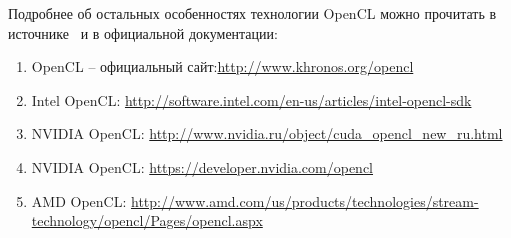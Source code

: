 \inputminted{c++}{listings/opencl_kernel_example.cpp}

Подробнее об остальных особенностях технологии OpenCL можно прочитать в источнике~\cite{Bastrakov2011} %
и в официальной документации:

\begin{enumerate}
    \item OpenCL -- официальный сайт:\url{http://www.khronos.org/opencl}
    \item Intel OpenCL: \url{http://software.intel.com/en-us/articles/intel-opencl-sdk}
    \item NVIDIA OpenCL: \url{http://www.nvidia.ru/object/cuda_opencl_new_ru.html}
    \item NVIDIA OpenCL: \url{https://developer.nvidia.com/opencl}
    \item AMD OpenCL: \url{http://www.amd.com/us/products/technologies/stream-technology/opencl/Pages/opencl.aspx}
\end{enumerate}
